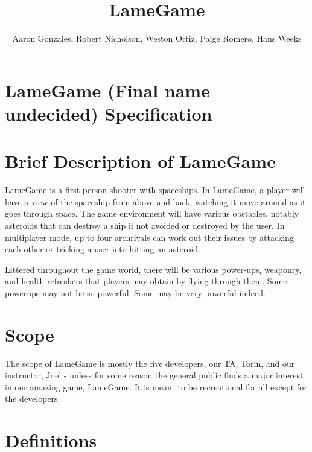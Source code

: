 \documentclass[titlepage]{article}\usepackage[]{graphicx}\usepackage[]{color}
\begin{document}
\title{LameGame}
\author{Aaron Gonzales, Robert Nicholson, Weston Ortiz, Paige Romero, Hans
Weeks}
\maketitle
\section{LameGame (Final name undecided)
Specification}\label{lamegame-final-name-undecided-specification}


\section{Brief Description of
LameGame}\label{brief-description-of-lamegame}

LameGame is a first person shooter with spaceships. In LameGame, a
player will have a view of the spaceship from above and back, watching
it move around as it goes through space. The game environment will have
various obstacles, notably asteroids that can destroy a ship if not
avoided or destroyed by the user. In multiplayer mode, up to four
archrivals can work out their issues by attacking each other or tricking
a user into hitting an asteroid.

Littered throughout the game world, there will be various power-ups,
weaponry, and health refreshers that players may obtain by flying
through them. Some powerups may not be so powerful. Some may be very
powerful indeed.

\section{Scope}\label{scope}

The scope of LameGame is mostly the five developers, our TA, Torin, and
our instructor, Joel - unless for some reason the general public finds a
major interest in our amazing game, LameGame. It is meant to be
recreational for all except for the developers.

\section{Definitions}\label{definitions}
\end{document}
